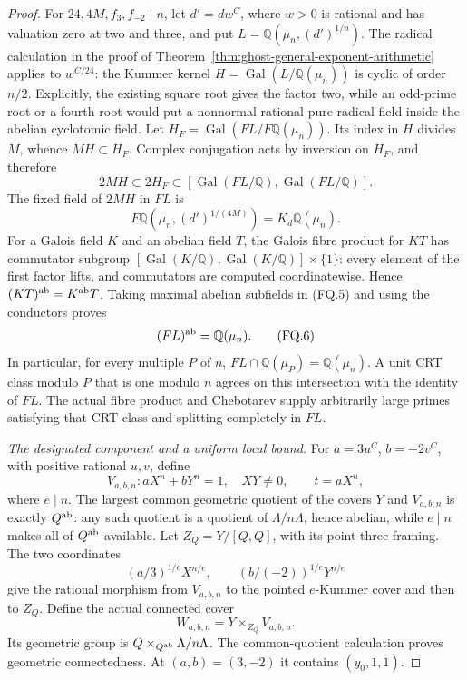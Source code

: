 \begin{proof}
For \(24,4M,f_3,f_{-2}\mid n\), let
\(d'=d w^C\), where \(w>0\) is rational and
has valuation zero at two and three, and put
\(L=\mathbb Q(\mu_n,(d')^{1/n})\).
The radical calculation in the proof of
Theorem~\ref{thm:ghost-general-exponent-arithmetic}
applies to \(w^{C/24}\): the Kummer kernel
\(H=\operatorname{Gal}(L/\mathbb Q(\mu_n))\)
is cyclic of order \(n/2\).
Explicitly, the existing square root gives the
factor two, while an odd-prime root or a fourth
root would put a nonnormal rational pure-radical
field inside the abelian cyclotomic field.
Let \(H_F=\operatorname{Gal}(FL/F\mathbb Q(\mu_n))\).
Its index in \(H\) divides \(M\), whence
\(MH\subset H_F\). Complex conjugation acts by
inversion on \(H_F\), and therefore
\[
 2MH\subset2H_F\subset
 [\operatorname{Gal}(FL/\mathbb Q),
   \operatorname{Gal}(FL/\mathbb Q)].
 \tag{FQ.5}
\]
The fixed field of \(2MH\) in \(FL\) is
\[
 F\mathbb Q(\mu_n,(d')^{1/(4M)})
   =K_d\mathbb Q(\mu_n).
\]
For a Galois field \(K\) and an abelian field
\(T\), the Galois fibre product for \(KT\)
has commutator subgroup \([\operatorname{Gal}(K/\mathbb Q),
\operatorname{Gal}(K/\mathbb Q)]\times\{1\}\):
every element of the first factor lifts, and
commutators are computed coordinatewise.
Hence \((KT)^{\rm ab}=K^{\rm ab}T\).
Taking maximal abelian subfields in (FQ.5)
and using the conductors proves
\[
 (FL)^{\rm ab}=\mathbb Q(\mu_n).
 \tag{FQ.6}
\]
In particular, for every multiple \(P\) of
\(n\), \(FL\cap\mathbb Q(\mu_P)=\mathbb Q(\mu_n)\).
A unit CRT class modulo \(P\) that is one
modulo \(n\) agrees on this intersection with
the identity of \(FL\). The actual fibre
product and Chebotarev
\cite[Theorem 8.31]{GhostMilneANT} supply
arbitrarily large primes satisfying that CRT
class and splitting completely in \(FL\).

\emph{The designated component and a uniform local bound.}
For \(a=3u^C\), \(b=-2v^C\), with positive
rational \(u,v\), define
\[
 V_{a,b,n}:aX^n+bY^n=1,\quad XY\ne0,
 \qquad t=aX^n,
 \tag{FQ.7}
\]
where \(e\mid n\). The largest common geometric
quotient of the covers \(Y\) and \(V_{a,b,n}\)
is exactly \(Q^{\rm ab}\): any such quotient
is a quotient of \(\Lambda/n\Lambda\), hence
abelian, while \(e\mid n\) makes all of
\(Q^{\rm ab}\) available.
Let \(Z_Q=Y/[Q,Q]\), with its point-three
framing. The two coordinates
\[
 (a/3)^{1/e}X^{n/e},\qquad
 (b/(-2))^{1/e}Y^{n/e}
 \tag{FQ.8}
\]
give the rational morphism from \(V_{a,b,n}\)
to the pointed \(e\)-Kummer cover and then to
\(Z_Q\). Define the actual connected cover
\[
 W_{a,b,n}=Y\mathbin{\times}_{Z_Q}V_{a,b,n}.
 \tag{FQ.9}
\]
Its geometric group is
\(Q\times_{Q^{\rm ab}}\Lambda/n\Lambda\).
The common-quotient calculation proves geometric
connectedness. At \((a,b)=(3,-2)\) it contains
\((y_0,1,1)\).


\end{proof}
